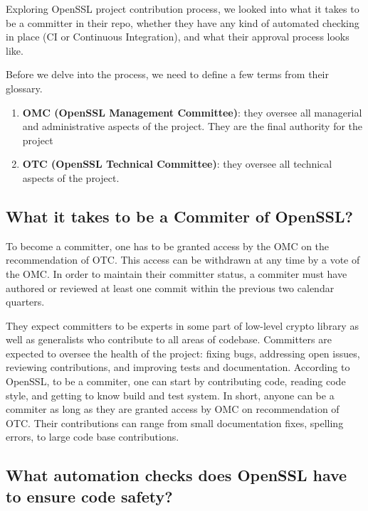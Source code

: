 \documentclass[conference]{IEEEtran}
\begin{document}
Exploring OpenSSL project contribution process, we looked into what it
takes to be a committer in their repo, whether they have any kind of
automated checking in place (CI or Continuous Integration), and what
their approval process looks like.

Before we delve into the process, we need to define a few terms from
their glossary.

\begin{enumerate}
\item \textbf{OMC (OpenSSL Management Committee)}: they oversee all
  managerial and administrative aspects of the project. They are the
  final authority for the project\cite{6}

\item \textbf{OTC (OpenSSL Technical Committee)}: they oversee all
  technical aspects of the project\cite{6}.

\end{enumerate}

\subsection{What it takes to be a Commiter of OpenSSL?}

To become a committer, one has to be granted access by the OMC on the
recommendation of OTC\cite{7}. This access can be withdrawn at any
time by a vote of the OMC\cite{8}. In order to maintain their
committer status, a commiter must have authored or reviewed at least
one commit within the previous two calendar quarters\cite{8}.

They expect committers to be experts in some part of low-level crypto
library as well as generalists who contribute to all areas of
codebase\cite{7}. Committers are expected to oversee the health of the
project: fixing bugs, addressing open issues, reviewing contributions,
and improving tests and documentation\cite{7}. According to OpenSSL,
to be a commiter, one can start by contributing code, reading code
style, and getting to know build and test system\cite{7}. In short,
anyone can be a commiter as long as they are granted access by OMC on
recommendation of OTC.  Their contributions can range from small
documentation fixes, spelling errors, to large code base
contributions.

\subsection{What automation checks does OpenSSL have to ensure code safety?}
\end{document}
